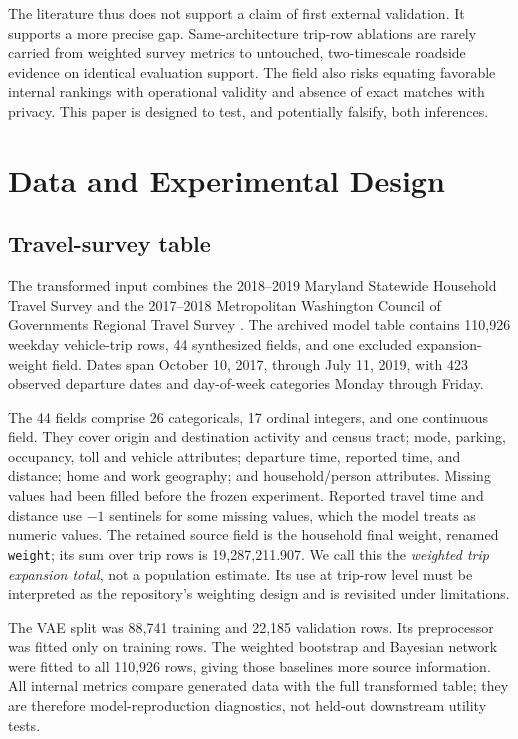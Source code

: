 \documentclass[numbered]{trbunofficial}
\begin{document}
The literature thus does not support a claim of first external validation. It supports a more precise gap. Same-architecture trip-row ablations are rarely carried from weighted survey metrics to untouched, two-timescale roadside evidence on identical evaluation support. The field also risks equating favorable internal rankings with operational validity and absence of exact matches with privacy. This paper is designed to test, and potentially falsify, both inferences.

\section{Data and Experimental Design}

\subsection{Travel-survey table}

The transformed input combines the 2018--2019 Maryland Statewide Household Travel Survey and the 2017--2018 Metropolitan Washington Council of Governments Regional Travel Survey \cite{bmc2020mts,mwcog2019rts}. The archived model table contains 110,926 weekday vehicle-trip rows, 44 synthesized fields, and one excluded expansion-weight field. Dates span October 10, 2017, through July 11, 2019, with 423 observed departure dates and day-of-week categories Monday through Friday.

The 44 fields comprise 26 categoricals, 17 ordinal integers, and one continuous field. They cover origin and destination activity and census tract; mode, parking, occupancy, toll and vehicle attributes; departure time, reported time, and distance; home and work geography; and household/person attributes. Missing values had been filled before the frozen experiment. Reported travel time and distance use $-1$ sentinels for some missing values, which the model treats as numeric values. The retained source field is the household final weight, renamed \texttt{weight}; its sum over trip rows is 19,287,211.907. We call this the \emph{weighted trip expansion total}, not a population estimate. Its use at trip-row level must be interpreted as the repository's weighting design and is revisited under limitations.

The VAE split was 88,741 training and 22,185 validation rows. Its preprocessor was fitted only on training rows. The weighted bootstrap and Bayesian network were fitted to all 110,926 rows, giving those baselines more source information. All internal metrics compare generated data with the full transformed table; they are therefore model-reproduction diagnostics, not held-out downstream utility tests.
\end{document}

